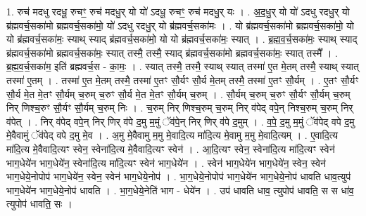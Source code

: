 \documentclass[17pt]{extarticle}
\begin{document}
1. रुच॑ मदधु रदधू॒ रुचꣳ॒॒ रुच॑ मदधु॒र् यो यो॑ ऽदधू॒ रुचꣳ॒॒ रुच॑ मदधु॒र् यः । . अ॒द॒धु॒र् यो यो॑ ऽदधु रदधु॒र् यो ब्र॑ह्मवर्च॒सका॑मो ब्रह्मवर्च॒सका॑मो॒ यो॑ ऽदधु रदधु॒र् यो ब्र॑ह्मवर्च॒सका॑मः । . यो ब्र॑ह्मवर्च॒सका॑मो ब्रह्मवर्च॒सका॑मो॒ यो यो ब्र॑ह्मवर्च॒सका॑मः॒ स्याथ् स्याद् ब्र॑ह्मवर्च॒सका॑मो॒ यो यो ब्र॑ह्मवर्च॒सका॑मः॒ स्यात् । . ब्र॒ह्म॒व॒र्च॒सका॑मः॒ स्याथ् स्याद् ब्र॑ह्मवर्च॒सका॑मो ब्रह्मवर्च॒सका॑मः॒ स्यात् तस्मै॒ तस्मै॒ स्याद् ब्र॑ह्मवर्च॒सका॑मो ब्रह्मवर्च॒सका॑मः॒ स्यात् तस्मै᳚ । . ब्र॒ह्म॒व॒र्च॒सका॑म॒ इति॑ ब्रह्मवर्च॒स - का॒मः॒ । . स्यात् तस्मै॒ तस्मै॒ स्याथ् स्यात् तस्मा॑ ए॒त मे॒तम् तस्मै॒ स्याथ् स्यात् तस्मा॑ ए॒तम् । . तस्मा॑ ए॒त मे॒तम् तस्मै॒ तस्मा॑ ए॒तꣳ सौ॒र्यꣳ सौ॒र्य मे॒तम् तस्मै॒ तस्मा॑ ए॒तꣳ सौ॒र्यम् । . ए॒तꣳ सौ॒र्यꣳ सौ॒र्य मे॒त मे॒तꣳ सौ॒र्यम् च॒रुम् च॒रुꣳ सौ॒र्य मे॒त मे॒तꣳ सौ॒र्यम् च॒रुम् । . सौ॒र्यम् च॒रुम् च॒रुꣳ सौ॒र्यꣳ सौ॒र्यम् च॒रुम् निर् णिश्च॒रुꣳ सौ॒र्यꣳ सौ॒र्यम् च॒रुम् निः । . च॒रुम् निर् णिश्च॒रुम् च॒रुम् निर् व॑पेद् वपे॒न् निश्च॒रुम् च॒रुम् निर् व॑पेत् । . निर् व॑पेद् वपे॒न् निर् णिर् व॑पे द॒मु म॒मुं ॅव॑पे॒न् निर् णिर् व॑पे द॒मुम् । . व॒पे॒ द॒मु म॒मुं ॅव॑पेद् वपे द॒मु मे॒वैवामुं ॅव॑पेद् वपे द॒मु मे॒व । . अ॒मु मे॒वैवामु म॒मु मे॒वादि॒त्य मा॑दि॒त्य मे॒वामु म॒मु मे॒वादि॒त्यम् । . ए॒वादि॒त्य मा॑दि॒त्य मे॒वैवादि॒त्यꣳ स्वेन॒ स्वेना॑दि॒त्य मे॒वैवादि॒त्यꣳ स्वेन॑ । . आ॒दि॒त्यꣳ स्वेन॒ स्वेना॑दि॒त्य मा॑दि॒त्यꣳ स्वेन॑ भाग॒धेये॑न भाग॒धेये॑न॒ स्वेना॑दि॒त्य मा॑दि॒त्यꣳ स्वेन॑ भाग॒धेये॑न । . स्वेन॑ भाग॒धेये॑न भाग॒धेये॑न॒ स्वेन॒ स्वेन॑ भाग॒धेये॒नोपोप॑ भाग॒धेये॑न॒ स्वेन॒ स्वेन॑ भाग॒धेये॒नोप॑ । . भा॒ग॒धेये॒नोपोप॑ भाग॒धेये॑न भाग॒धेये॒नोप॑ धावति धाव॒त्युप॑ भाग॒धेये॑न भाग॒धेये॒नोप॑ धावति । . भा॒ग॒धेये॒नेति॑ भाग - धेये॑न । . उप॑ धावति धाव॒ त्युपोप॑ धावति॒ स स धा॑व॒ त्युपोप॑ धावति॒ सः । \newline
\end{document}
